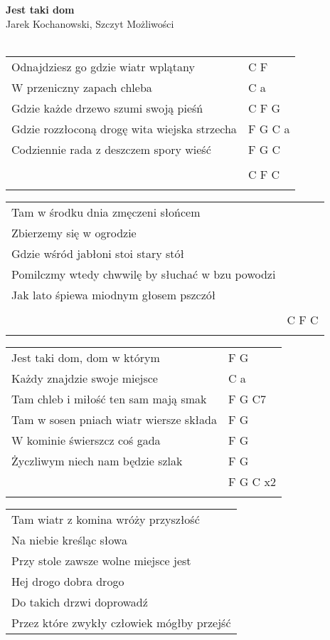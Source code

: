 \documentclass[a5paper]{article}
\begin{document}


\noindent
\fontsize{12pt}{15pt}\selectfont
\textbf{Jest taki dom} \\
\fontsize{8pt}{10pt}\selectfont
Jarek Kochanowski, Szczyt Możliwości \\ \\
\fontsize{10pt}{12pt}\selectfont
{}
\begin{tabular}{@{}p{8.50cm}p{3cm}@{}}
\noindent
Odnajdziesz go gdzie wiatr wplątany & C F \\
W przeniczny zapach chleba & C a \\
Gdzie każde drzewo szumi swoją pieśń & C F G \\
Gdzie rozzłoconą drogę wita wiejska strzecha & F G C a \\
Codziennie rada z deszczem spory wieść & F G C \\ \\
										 & C F C \\ \\
\end{tabular}

\noindent
\begin{tabular}{@{}p{8.50cm}p{3cm}@{}}
Tam w środku dnia zmęczeni słońcem & \\
Zbierzemy się w ogrodzie & \\
Gdzie wśród jabłoni stoi stary stół & \\
Pomilczmy wtedy chwwilę by słuchać w bzu powodzi & \\
Jak lato śpiewa miodnym głosem pszczół & \\ \\
									   & C F C \\ \\
\end{tabular}

\noindent
\begin{tabular}{@{}p{7.50cm}p{3cm}@{}}
Jest taki dom, dom w którym & F G \\
Każdy znajdzie swoje miejsce & C a \\
Tam chleb i miłość ten sam mają smak & F G C7 \\
Tam w sosen pniach wiatr wiersze składa & F G \\
W kominie świerszcz coś gada & F G \\ 
Życzliwym niech nam będzie szlak & F G \\
							   & F G C x2 \\ \\
\end{tabular}

\noindent
\begin{tabular}{@{}p{8.50cm}@{}}
Tam wiatr z komina wróży przyszłość \\
Na niebie kreśląc słowa \\
Przy stole zawsze wolne miejsce jest \\
Hej drogo dobra drogo \\
Do takich drzwi doprowadź \\
Przez które zwykły człowiek mógłby przejść
\end{tabular}
\end{document}

